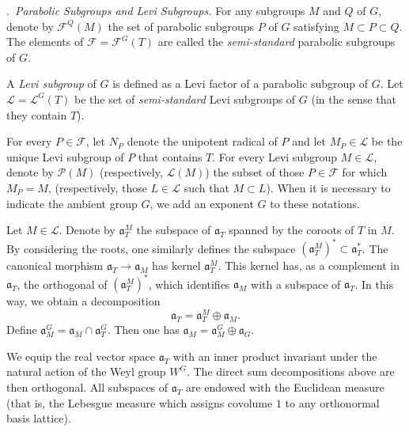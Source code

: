\documentclass[12pt,a4paper,oneside,english,leqno]{smfart}
\makeatletter
\numberwithin{equation}{subsection}
\numberwithin{theo}{subsection}
\newenvironment{paragr}[1][]{\medskip\refstepcounter{subsection}%
  \par\noindent\hspace*{\parindent}\thesubsection.\ \emph{#1}%
  \@ifundefined{@empty}{}{}\ignorespaces}{\medskip}
\theoremstyle{plain}
\theoremstyle{definition}
\theoremstyle{remark}
\newcommand{\lc}{\mathcal{L}}
\newcommand{\fc}{\mathcal{F}}
\newcommand{\pc}{\mathcal{P}}
\newcommand{\ago}{\mathfrak{a}}
\makeatother
\begin{document}
\begin{paragr}[Parabolic Subgroups and Levi Subgroups.]\label{S:2.4}
For any subgroups $M$ and $Q$ of $G$, denote by $\fc^Q(M)$ the set of parabolic subgroups $P$ of $G$ satisfying $M\subset P\subset Q$. The elements of $\fc=\fc^G(T)$ are called the \emph{semi-standard} parabolic subgroups of $G$.

A \emph{Levi subgroup} of $G$ is defined as a Levi factor of a parabolic subgroup of $G$. Let $\lc=\lc^G(T)$ be the set of \emph{semi-standard} Levi subgroups of $G$ (in the sense that they contain $T$).

For every $P\in\fc$, let $N_P$ denote the unipotent radical of $P$ and let $M_P\in \lc$ be the unique Levi subgroup of $P$ that contains $T$. For every Levi subgroup $M\in \lc$, denote by $\pc(M)$ (respectively, $\lc(M)$) the subset of those $P\in  \fc$ for which $M_P=M$, (respectively, those $L\in \lc$ such that $M\subset L$). When it is necessary to indicate the ambient group $G$, we add an exponent $G$ to these notations.

Let $M\in \lc$. Denote by $\ago_T^M$ the subspace of $\ago_T$ spanned by the coroots of $T$ in $M$. By considering the roots, one similarly defines the subspace $(\ago_T^M)^*\subset \ago_T^*$. The canonical morphism $\ago_T \to \ago_M$ has kernel $\ago_T^M$. This kernel has, as a complement in $\ago_T$, the orthogonal of $(\ago_T^M)^*$, which identifies $\ago_M$ with a subspace of $\ago_T$. In this way, we obtain a decomposition
$$\ago_T=\ago_T^M \oplus \ago_M.$$
Define $\ago_M^G=\ago_M \cap \ago_T^G$. Then one has $\ago_M=\ago_M^G \oplus \ago_G$.

\medskip

We equip the real vector space $\ago_T$ with an inner product invariant under the natural action of the Weyl group $W^G$. The direct sum decompositions above are then orthogonal. All subspaces of $\ago_T$ are endowed with the Euclidean measure (that is, the Lebesgue measure which assigns covolume $1$ to any orthonormal basis lattice).
\end{paragr}
\end{document}
